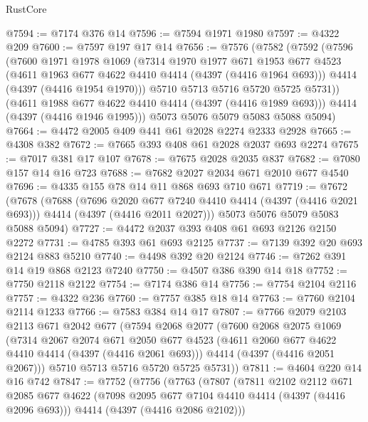 \begin{lexlean}{RustCore}
\begin{coremodule}
@7594 := @7174 @376 @14
@7596 := @7594 @1971 @1980
@7597 := @4322 @209
@7600 := @7597 @197 @17 @14
@7656 := @7576
    (@7582
      (@7592
        (@7596
          (@7600
            @1971
            @1978
            @1069
            (@7314
              @1970
              @1977
              @671
              @1953
              @677
              @4523
              (@4611 @1963 @677 @4622 @4410 @4414 (@4397 (@4416 @1964 @693)))
              @4414
              (@4397 (@4416 @1954 @1970)))
            @5710
            @5713
            @5716
            @5720
            @5725
            @5731))
        (@4611 @1988 @677 @4622 @4410 @4414 (@4397 (@4416 @1989 @693)))
        @4414
        (@4397 (@4416 @1946 @1995)))
      @5073
      @5076
      @5079
      @5083
      @5088
      @5094)
@7664 := @4472 @2005 @409 @441 @61 @2028 @2274 @2333 @2928
@7665 := @4308 @382
@7672 := @7665 @393 @408 @61 @2028 @2037 @693 @2274
@7675 := @7017 @381 @17 @107
@7678 := @7675 @2028 @2035 @837
@7682 := @7080 @157 @14 @16 @723
@7688 := @7682 @2027 @2034 @671 @2010 @677 @4540
@7696 := @4335 @155 @78 @14 @11 @868 @693 @710 @671
@7719 := @7672
    (@7678
      (@7688
        (@7696 @2020 @677 @7240 @4410 @4414 (@4397 (@4416 @2021 @693)))
        @4414
        (@4397 (@4416 @2011 @2027)))
      @5073
      @5076
      @5079
      @5083
      @5088
      @5094)
@7727 := @4472 @2037 @393 @408 @61 @693 @2126 @2150 @2272
@7731 := @4785 @393 @61 @693 @2125
@7737 := @7139 @392 @20 @693 @2124 @883 @5210
@7740 := @4498 @392 @20 @2124
@7746 := @7262 @391 @14 @19 @868 @2123 @7240
@7750 := @4507 @386 @390 @14 @18
@7752 := @7750 @2118 @2122
@7754 := @7174 @386 @14
@7756 := @7754 @2104 @2116
@7757 := @4322 @236
@7760 := @7757 @385 @18 @14
@7763 := @7760 @2104 @2114 @1233
@7766 := @7583 @384 @14 @17
@7807 := @7766
    @2079
    @2103
    @2113
    @671
    @2042
    @677
    (@7594
      @2068
      @2077
      (@7600
        @2068
        @2075
        @1069
        (@7314
          @2067
          @2074
          @671
          @2050
          @677
          @4523
          (@4611 @2060 @677 @4622 @4410 @4414 (@4397 (@4416 @2061 @693)))
          @4414
          (@4397 (@4416 @2051 @2067)))
        @5710
        @5713
        @5716
        @5720
        @5725
        @5731))
@7811 := @4604 @220 @14 @16 @742
@7847 := @7752
    (@7756
      (@7763
        (@7807
          (@7811
            @2102
            @2112
            @671
            @2085
            @677
            @4622
            (@7098 @2095 @677 @7104 @4410 @4414 (@4397 (@4416 @2096 @693)))
            @4414
            (@4397 (@4416 @2086 @2102)))

\end{coremodule}
\end{lexlean}
